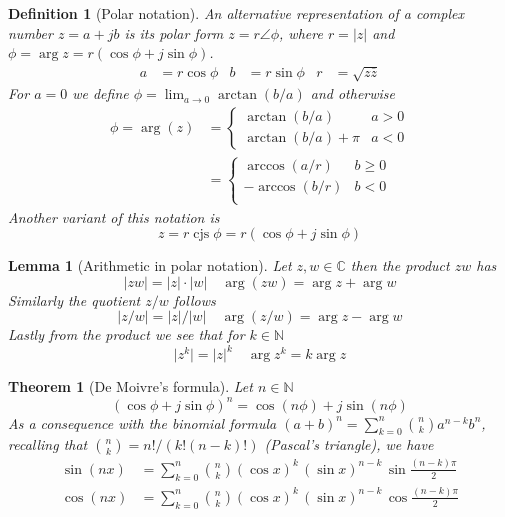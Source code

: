 \documentclass[twocolumn, margin=normal]{tex/hsrzf}
\newcommand\Nset{\mathbb{N}}
\newcommand\Cset{\mathbb{C}}
\DeclareMathOperator\cjs{cjs}
\newcommand\conj[1]{\overline{#1}}
\newcommand\len[1]{\lvert#1\rvert}
\theoremstyle{komfourzf}
\newtheorem{theorem}{Theorem}
\newtheorem{definition}{Definition}
\newtheorem{lemma}{Lemma}
\begin{document}
\begin{definition}[Polar notation]
  An alternative representation of a complex number \(z = a + jb\) is its \emph{polar form} \(z = r \angle \phi\), where \(r = \len{z}\) and \(\phi = \arg{z} = r(\cos\phi + j\sin\phi)\).
  \begin{align*}
    a &= r\cos\phi &
    b &= r \sin\phi &
    r &= \sqrt{z\conj{z}}
  \end{align*}
  For \(a = 0\) we define \(\phi = \lim_{a\to 0} \arctan(b/a)\) and otherwise
  \begin{align*}
    \phi = \arg(z)
    &= \begin{cases}
      \arctan(b/a) & a > 0 \\
      \arctan(b/a) + \pi & a < 0
    \end{cases} \\
    &= \begin{cases}
      \arccos(a/r) & b \geq 0 \\
      -\arccos(b/r) & b < 0 \\
    \end{cases}
  \end{align*}
  Another variant of this notation is
  \[
    z = r\cjs\phi = r(\cos\phi + j\sin\phi)
  \]
\end{definition}

\begin{lemma}[Arithmetic in polar notation]
  Let \(z,w\in\Cset\) then the product \(zw\) has
  \[
    \len{zw} = \len{z}\cdot\len{w} \quad
    \arg(zw) = \arg z + \arg w
  \]
  Similarly the quotient \(z/w\) follows
  \[
    \len{z/w} = \len{z}/\len{w} \quad
    \arg(z/w) = \arg z - \arg w
  \]
  Lastly from the product we see that for \(k \in \Nset\)
  \[
    \len{z^k} = \len{z}^k \quad
    \arg{z^k} = k \arg{z}
  \]
\end{lemma}

\begin{theorem}[De Moivre's formula]
  Let \(n \in\Nset\)
  \[
    \left(\cos\phi + j\sin\phi\right)^n = \cos(n\phi) + j\sin(n\phi)
  \]
  As a consequence with the binomial formula
  \((a + b)^n = \sum_{k=0}^n \binom{n}{k} a^{n-k} b^n\), recalling that \(\binom{n}{k} = n!/(k!(n-k)!)\) (Pascal's triangle), we have
  \begin{align*}
    \sin(nx)&=\sum _{k=0}^{n}{\binom {n}{k}}(\cos x)^{k}\,(\sin x)^{n-k}\,\sin {\frac {(n-k)\pi }{2}}\\
    \cos(nx)&=\sum _{k=0}^{n}{\binom {n}{k}}(\cos x)^{k}\,(\sin x)^{n-k}\,\cos {\frac {(n-k)\pi }{2}}
  \end{align*}
\end{theorem}
\end{document}
